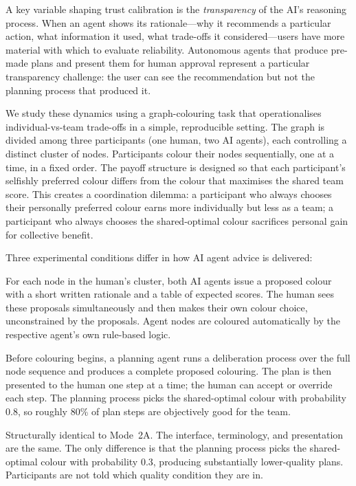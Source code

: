 \documentclass[11pt]{article}
\theoremstyle{definition}
\begin{document}
A key variable shaping trust calibration is the \emph{transparency} of the AI's reasoning
process.  When an agent shows its rationale---why it recommends a particular action, what
information it used, what trade-offs it considered---users have more material with which to
evaluate reliability.  Autonomous agents that produce pre-made plans and present them for
human approval represent a particular transparency challenge: the user can see the
recommendation but not the planning process that produced it.

We study these dynamics using a graph-colouring task that operationalises individual-vs-team
trade-offs in a simple, reproducible setting.  The graph is divided among three participants
(one human, two AI agents), each controlling a distinct cluster of nodes.  Participants
colour their nodes sequentially, one at a time, in a fixed order.  The payoff structure is
designed so that each participant's selfishly preferred colour differs from the colour that
maximises the shared team score.  This creates a coordination dilemma: a participant who
always chooses their personally preferred colour earns more individually but less as a team;
a participant who always chooses the shared-optimal colour sacrifices personal gain for
collective benefit.

Three experimental conditions differ in how AI agent advice is delivered:

\begin{description}[leftmargin=2em,itemsep=2pt]
  \item[Mode~1 (Manual Collaborative)]  For each node in the human's cluster, both AI
    agents issue a proposed colour with a short written rationale and a table of expected
    scores.  The human sees these proposals simultaneously and then makes their own colour
    choice, unconstrained by the proposals.  Agent nodes are coloured automatically by
    the respective agent's own rule-based logic.
  \item[Mode~2A (Autonomous, High Quality)]  Before colouring begins, a planning agent
    runs a deliberation process over the full node sequence and produces a complete
    proposed colouring.  The plan is then presented to the human one step at a time; the
    human can accept or override each step.  The planning process picks the shared-optimal
    colour with probability 0.8, so roughly 80\% of plan steps are objectively good for
    the team.
  \item[Mode~2B (Autonomous, Low Quality)]  Structurally identical to Mode~2A.  The
    interface, terminology, and presentation are the same.  The only difference is that
    the planning process picks the shared-optimal colour with probability 0.3, producing
    substantially lower-quality plans.  Participants are not told which quality condition
    they are in.
\end{description}
\end{document}
